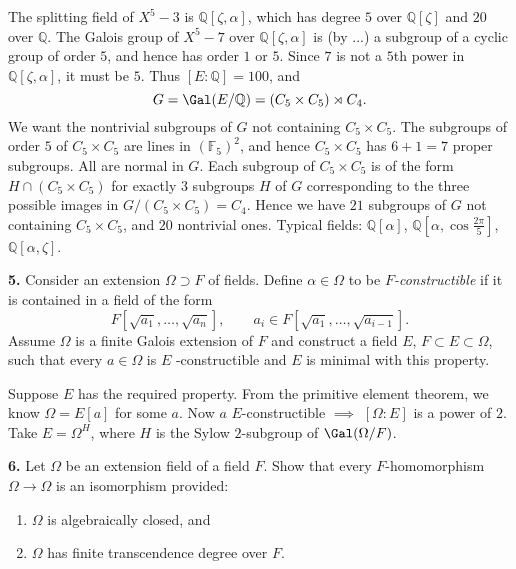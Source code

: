 \documentclass[a4paper,11pt,final,openany]{memoir}
\theoremstyle{nonumberplain}
\begin{document}
The splitting field of $X^{5}-3$ is ${\mathbb{Q}}[\zeta,\alpha]$, which has
degree $5$ over ${\mathbb{Q}}[\zeta]$ and $20$ over ${\mathbb{Q}}$. The Galois
group of $X^{5}-7$ over ${\mathbb{Q}}[\zeta,\alpha]$ is (by ...) a subgroup of
a cyclic group of order $5$, and hence has order $1$ or $5$. Since $7$ is not
a $5$th power in ${\mathbb{Q}}[\zeta,\alpha]$, it must be $5$. Thus
$[E\colon{\mathbb{Q}}]=100$, and
\[
G=\Gal(E/{\mathbb{Q}})=(C_{5}\times C_{5})\rtimes C_{4}.
\]
We want the nontrivial subgroups of $G$ not containing $C_{5}\times C_{5}$.
The subgroups of order $5$ of $C_{5}\times C_{5}$ are lines in $(\mathbb{F}%
_{5})^{2}$, and hence $C_{5}\times C_{5}$ has $6+1=7$ proper subgroups. All
are normal in $G$. Each subgroup of $C_{5}\times C_{5}$ is of the form
$H\cap(C_{5}\times C_{5})$ for exactly $3$ subgroups $H$ of $G$ corresponding
to the three possible images in $G/(C_{5}\times C_{5})=C_{4}$. Hence we have
$21$ subgroups of $G$ not containing $C_{5}\times C_{5}$, and $20$ nontrivial
ones. Typical fields: ${\mathbb{Q}}[\alpha]$, ${\mathbb{Q}}[\alpha,\cos
\frac{2\pi}{5}]$, ${\mathbb{Q}}[\alpha,\zeta]$.


\medskip\noindent\textbf{5.} Consider an extension $\Omega\supset F$ of
fields. Define $\alpha\in\Omega$ to be $F$\textit{-constructible\/} if it is
contained in a field of the form
\[
F[\sqrt{a_{1}},\ldots,\sqrt{a_{n}}],\qquad a_{i}\in F[\sqrt{a_{1}}%
,\ldots,\sqrt{a_{i-1}}].
\]
Assume $\Omega$ is a finite Galois extension of $F$ and construct a field $E
$, $F\subset E\subset\Omega$, such that every $a\in\Omega$ is $E$%
-constructible and $E$ is minimal with this property.

Suppose $E$ has the required property. From the primitive element theorem, we
know $\Omega=E[a]$ for some $a$. Now $a$ $E$-constructible $\implies$
$[\Omega\colon E]$ is a power of $2$. Take $E=\Omega^{H}$, where $H$ is the
Sylow $2$-subgroup of $\Gal(\Omega/F)$.

\medskip\noindent\textbf{6.} Let $\Omega$ be an extension field of a field $F
$. Show that every $F$-homomorphism $\Omega\to\Omega$ is an isomorphism provided:

\begin{enumerate}
\item $\Omega$ is algebraically closed, and

\item $\Omega$ has finite transcendence degree over $F$.
\end{enumerate}
\end{document}
